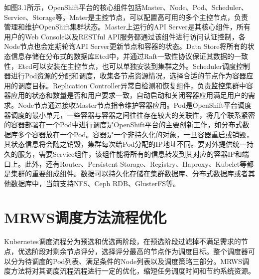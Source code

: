 如图3.1所示，OpenShift平台的核心组件包括Master、Node、Pod、Scheduler、Service、Storage等。Mater是主控节点，可以配置高可用的多个主控节点，负责管理和维护OpenShift集群状态。Master上运行的API Server是其核心组件，所有用户的Web Console以及RESTful API服务都通过该组件进行访问认证控制，各Node节点也会定期轮询API Server更新节点和容器的状态。Data Store将所有的状态信息存储在分布式的数据库Etcd中，并通过Raft一致性协议保证其数据的一致性，Etcd可以安装在主控节点，也可以单独安装到集群之外。Scheduler调度控制器进行Pod资源的分配和调度，收集各节点资源情况，选择合适的节点作为容器应用的调度目标。Replication Controller异常自检测和恢复组件，负责监控集群中容器应用的状态和数量是否和用户要求一致，自动启动和关闭容器应用满足用户的需求。Node节点通过接收Master节点指令维护容器应用。Pod是OpenShift平台调度器调度的最小单元，一些容器与容器之间往往存在较大的关联性，将几个联系紧密的容器部署在一个Pod中进行调度是OpenShift平台的主要创新工作，如分布式数据库多个容器放在一个Pod。容器是一个非持久化的对象，一旦容器重启或销毁，其状态信息将会随之销毁，集群每次给Pod分配的IP地址不同。要对外提供统一持久的服务，需要Service组件，该组件能将所有的信息转发到其对应的容器IP和端口上。此外，还有Router、Persistent Storage、Registry、Haproxy、Kubelet等都是集群的重要组成组件。数据可以持久化存储在集群数据库、分布式数据库或者其他数据库中，当前支持NFS、Ceph RDB、GlusterFS等。

\section{MRWS调度方法流程优化}
Kubernetes调度流程分为预选和优选两阶段，在预选阶段过滤掉不满足需求的节点，优选阶段对剩余节点评分，选择评分最高的节点作为调度目标。整个调度器可以分为待调度的Pod列表、满足条件的Node列表以及调度策略三部分。MRWS调度方法将对其调度流程流程进行一定的优化，缩短任务调度时间和节约系统资源。

